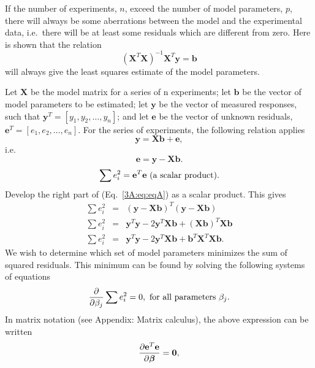 If the number of experiments, $n$, exceed the number of model
parameters, $p$, there will always be some aberrations between the
model and the experimental data, i.e.\ there will be at least some
residuals which are different from zero. Here is shown that the
relation
%
\begin{equation}
\left(\mathbf{X}^T\mathbf{X}\right)^{-1} \mathbf{X}^T \mathbf{y} = \mathbf{b}
\end{equation}
%
will always give the least squares estimate of the model parameters.

Let $\mathbf{X}$ be the model matrix for a series of n experiments; let $\mathbf{b}$ be the vector of model parameters to be estimated; let $\mathbf{y}$ be the vector of measured responses, such that $\mathbf{y}^T = [y_1, y_2, \ldots, y_n]$; and let $\mathbf{e}$ be the vector of
unknown residuals, $\mathbf{e}^T = [e_1, e_2, \ldots, e_n]$. For the series of experiments, the following relation applies
%
\begin{equation}
\mathbf{y} = \mathbf{Xb + e},
\end{equation}
%
i.e.\
%
\begin{equation}
\mathbf{e = y - Xb}.
\label{3A:eq:eqA}
\end{equation}
%
%
\begin{equation}
\sum e_i^2 = \mathbf{e}^T\mathbf{e} \textnormal{ (a scalar product)}.
\end{equation}
%
Develop the right part of (Eq.\ \ref{3A:eq:eqA}) as a scalar product. This gives
%
\begin{eqnarray}
\sum e_i^2 & = & (\mathbf{y - Xb})^T \mathbf{(y - Xb)}\\%
\sum e_i^2 & = & \mathbf{y}^T\mathbf{y} - 2\mathbf{y}^T\mathbf{Xb} + (\mathbf{Xb})^T\mathbf{Xb}\\%
\sum e_i^2 & = & \mathbf{y}^T \mathbf{y} - 2\mathbf{y}^T\mathbf{Xb} + \mathbf{b}^T \mathbf{X}^T \mathbf{Xb}.
\end{eqnarray}
%
We wish to determine which set of model parameters minimizes the sum of squared residuals. This
minimum can be found by solving the following systems of equations
%
\begin{equation}
\frac{\partial}{\partial \beta_j}\sum e_i^2 = 0,   \textnormal{ for all parameters } \beta_j.
\end{equation}
%
In matrix notation (see Appendix: Matrix calculus), the above expression can be written
%
\begin{equation}
\frac{\partial \mathbf{e}^T\mathbf{e}}{\partial \mbox{\boldmath $\beta$}} =
\mathbf{0},
\end{equation}
